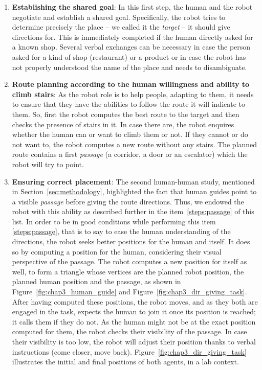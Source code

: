\documentclass[a4paper,11pt,twoside]{StyleThese}
\begin{document}
\begin{enumerate}
	\item \textbf{Establishing the shared goal}: In this first step, the human and the robot negotiate and establish a shared goal. Specifically, the robot tries to determine precisely the place -- we called it the \emph{target} -- it should give directions for. This is immediately completed if the human directly asked for a known shop. Several verbal exchanges can be necessary in case the person asked for a kind of shop (\eg restaurant) or a product or in case the robot has not properly understood the name of the place and needs to disambiguate.
	\item \textbf{Route planning according to the human willingness and ability to climb stairs}: As the robot role is to help people, adapting to them, it needs to ensure that they have the abilities to follow the route it will indicate to them. So, first the robot computes the best route to the target and then checks the presence of stairs in it. In case there are, the robot enquires whether the human can or want to climb them or not. If they cannot or do not want to, the robot computes a new route without any stairs. The planned route contains a first  \emph{passage} (\ie a corridor, a door or an escalator) which the robot will try to point.
	\item \textbf{Ensuring correct placement}: The second human-human study, mentioned in Section~\ref{sec:methodology}, highlighted the fact that human guides point to a visible \emph{passage} before giving the route directions. Thus, we endowed the robot with this ability as described further in the item~\ref{steps:passage} of this list. In order to be in good conditions while performing this item \ref{steps:passage}, that is to say to ease the human understanding of the directions, the robot seeks better positions for the human and itself. It does so by computing a position for the human, considering their visual perspective of the passage.
	The robot computes a new position for itself as well, to form a triangle whose vertices are the planned robot position, the planned human position and the passage, as shown in Figure~\ref{fig:chap3_human_guide} and Figure~\ref{fig:chap3_dir_giving_task}. After having computed these positions, the robot moves, and as they both are engaged in the task, expects the human to join it once its position is reached; it calls them if they do not. As the human might not be at the exact position computed for them, the robot checks their visibility of the passage. In case their visibility is too low, the robot will adjust their position thanks to verbal instructions (\ie come closer, move back). Figure~\ref{fig:chap3_dir_giving_task} illustrates the initial and final positions of both agents, in a lab context. 

\end{enumerate}
\end{document}
